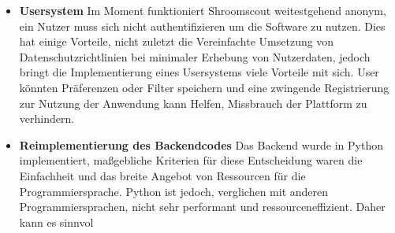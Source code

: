 \documentclass[../main.tex]{subfiles}
\begin{document}
\begin{itemize}
    \item \textbf{Usersystem}
        Im Moment funktioniert Shroomscout weitestgehend anonym, ein Nutzer muss sich nicht authentifizieren um die Software zu nutzen. Dies hat einige Vorteile, nicht zuletzt die
        Vereinfachte Umsetzung von Datenschutzrichtlinien bei minimaler Erhebung von Nutzerdaten, jedoch bringt die Implementierung eines Usersystems viele Vorteile mit sich.
        User könnten Präferenzen oder Filter speichern und eine zwingende Registrierung zur Nutzung der Anwendung kann Helfen, Missbrauch der Plattform zu verhindern.

    \item \textbf{Reimplementierung des Backendcodes}
        Das Backend wurde in Python implementiert, maßgebliche Kriterien für diese Entscheidung waren die Einfachheit und das breite Angebot von Ressourcen für die Programmiersprache.
        Python ist jedoch, verglichen mit anderen Programmiersprachen, nicht sehr performant und ressourceneffizient. Daher kann es sinnvol

\end{itemize}
\end{document}
